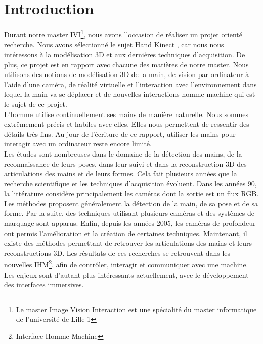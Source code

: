 \chapter*{Introduction}

Durant notre master IVI\footnote{Le master Image Vision Interaction est 
une spécialité du master informatique de l'université de Lille 1}, 
nous avons l'occasion de réaliser un projet orienté recherche. Nous avons 
sélectionné le sujet \og Hand Kinect \fg, car nous nous intéressons à la 
modélisation 3D et aux dernières techniques d'acquisition.
De plus, ce projet est en rapport avec chacune des matières de
notre master. Nous utilisons des notions de modélisation 3D de la main, de vision par ordinateur à l'aide d'une caméra, de réalité virtuelle et l'interaction avec l'environnement dans lequel la main va se déplacer et de nouvelles interactions
homme machine qui est le sujet de ce projet.\\

L'homme utilise continuellement ses mains de manière naturelle. Nous 
sommes extrêmement précis et habiles avec elles. Elles nous permettent 
de ressentir des détails très fins. Au jour de l'écriture de ce rapport, 
utiliser les mains pour interagir avec un ordinateur reste encore limité.\\

Les études sont nombreuses dans le domaine de la détection des mains, 
de la reconnaissance de leurs poses, dans leur suivi et dans la reconstruction 
3D des articulations des mains et de leurs formes. Cela fait plusieurs 
années que la recherche scientifique et les techniques d'acquisition 
évoluent. Dans les années 90, la littérature considère principalement les 
caméras dont la sortie est un flux RGB. Les méthodes proposent généralement la 
détection de la main, de sa pose et de sa forme. Par la suite, des techniques 
utilisant plusieurs caméras et des systèmes de marquage sont apparus. 
Enfin, depuis les années 2005, les caméras de profondeur ont permis 
l'amélioration et la création de certaines techniques. Maintenant, il 
existe des méthodes permettant de retrouver les articulations des mains 
et leurs reconstructions 3D. Les résultats de ces recherches se 
retrouvent dans les nouvelles IHM\footnote{Interface Homme-Machine}, 
afin de contrôler, interagir et communiquer avec une machine. Les enjeux 
sont d'autant plus intéressants actuellement, avec le développement des 
interfaces immersives.\\

